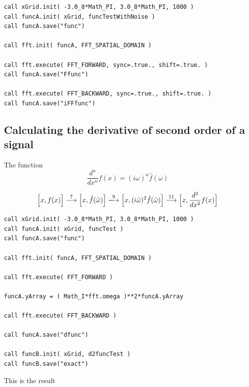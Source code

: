 \lstset{language=Fortran}
\begin{lstlisting}
call xGrid.init( -3.0_8*Math_PI, 3.0_8*Math_PI, 1000 )
call funcA.init( xGrid, funcTestWithNoise )
call funcA.save("func")  
  
call fft.init( funcA, FFT_SPATIAL_DOMAIN )

call fft.execute( FFT_FORWARD, sync=.true., shift=.true. )
call funcA.save("Ffunc")

call fft.execute( FFT_BACKWARD, sync=.true., shift=.true. )
call funcA.save("iFFfunc")
\end{lstlisting}

\subsection{Calculating the derivative of second order of a signal}
The function 
\begin{equation}
\frac{d^n}{dx^n}f(x) = (i\omega)^n\hat{f}(\omega)
\end{equation}

\begin{equation}
\Bigl[x,f(x)\Bigr]
\stackrel{\text{7}}{\longrightarrow}
\Bigl[x,\hat{f}(\tilde{\omega})\Bigr]
\xlongrightarrow{\text{9}}
\Bigl[x,(i\tilde{\omega})^2\hat{f}(\tilde{\omega})\Bigr]
\stackrel{\text{11}}{\longrightarrow}
\Bigl[x,\frac{d^2}{dx^2}f(x)\Bigr]
\end{equation}

\lstset{language=Fortran}
\begin{lstlisting}
call xGrid.init( -3.0_8*Math_PI, 3.0_8*Math_PI, 1000 )
call funcA.init( xGrid, funcTest )
call funcA.save("func")

call fft.init( funcA, FFT_SPATIAL_DOMAIN )

call fft.execute( FFT_FORWARD )

funcA.yArray = ( Math_I*fft.omega )**2*funcA.yArray

call fft.execute( FFT_BACKWARD )

call funcA.save("dfunc")

call funcB.init( xGrid, d2funcTest )
call funcB.save("exact")
\end{lstlisting}

This is the result

